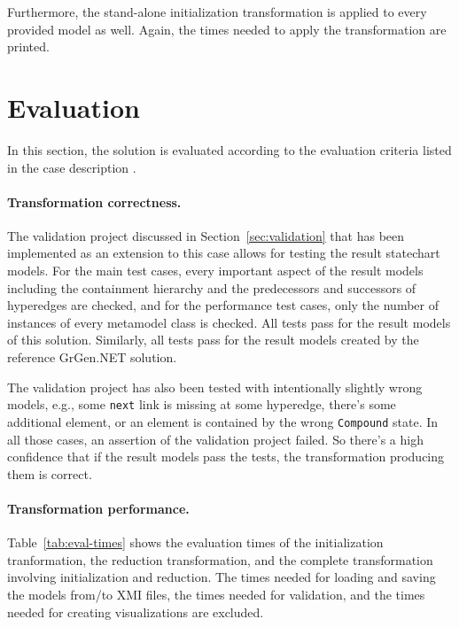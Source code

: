 \documentclass[11pt]{article}
\begin{document}
Furthermore, the stand-alone initialization transformation is applied to every
provided model as well.  Again, the times needed to apply the transformation
are printed.


\section{Evaluation}
\label{sec:evaluation}

In this section, the solution is evaluated according to the evaluation criteria
listed in the case description \cite{pn2sccasedesc}.

\paragraph{Transformation correctness.}

The validation project discussed in Section~\ref{sec:validation} that has been
implemented as an extension to this case allows for testing the result
statechart models.  For the main test cases, every important aspect of the
result models including the containment hierarchy and the predecessors and
successors of hyperedges are checked, and for the performance test cases, only
the number of instances of every metamodel class is checked.  All tests pass
for the result models of this solution.  Similarly, all tests pass for the
result models created by the reference GrGen.NET solution.

The validation project has also been tested with intentionally slightly wrong
models, e.g., some \verb|next| link is missing at some hyperedge, there's some
additional element, or an element is contained by the wrong \verb|Compound|
state.  In all those cases, an assertion of the validation project failed.  So
there's a high confidence that if the result models pass the tests, the
transformation producing them is correct.

\paragraph{Transformation performance.}


Table~\ref{tab:eval-times} shows the evaluation times of the initialization
tranformation, the reduction transformation, and the complete transformation
involving initialization and reduction.  The times needed for loading and
saving the models from/to XMI files, the times needed for validation, and the
times needed for creating visualizations are excluded.
\end{document}
